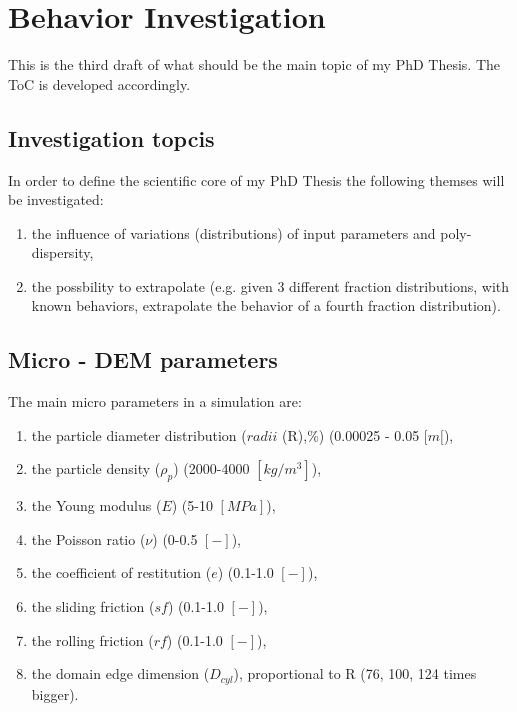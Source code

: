 
\section{Behavior Investigation}
\label{section:behaviorinvestigation}

This is the third draft of what should be the main topic of my PhD Thesis. The ToC is developed accordingly.

\subsection{Investigation topcis}
\label{subsection:investigationtopics}

In order to define the scientific core of my PhD Thesis the following themses will be investigated:
\begin{enumerate}
\item{the influence of variations (distributions) of input parameters and poly-dispersity,}
\item{the possbility to extrapolate (e.g. given 3 different fraction distributions, with known behaviors, extrapolate the behavior of a fourth fraction distribution).}
\end{enumerate}

\subsection{Micro - DEM parameters}
\label{subsection:microparameters}

The main micro parameters in a simulation are:

\begin{enumerate}[label=(\Alph*)]
\item{the particle diameter distribution ($radii$ (R),\%) (0.00025 - 0.05 $[m[$),}
\item{the particle density ($\rho_p$) (2000-4000 $[kg/m^3]$),}
\item{the Young modulus ($E$) (5-10 $[MPa]$),}
\item{the Poisson ratio ($\nu$) (0-0.5 $[-]$),}
\item{the coefficient of restitution ($e$) (0.1-1.0 $[-]$),}
\item{the sliding friction ($sf$) (0.1-1.0 $[-]$),}
\item{the rolling friction ($rf$) (0.1-1.0 $[-]$),}
\item{the domain edge dimension ($D_{cyl}$), proportional to R (76, 100, 124 times bigger).}
\end{enumerate}

